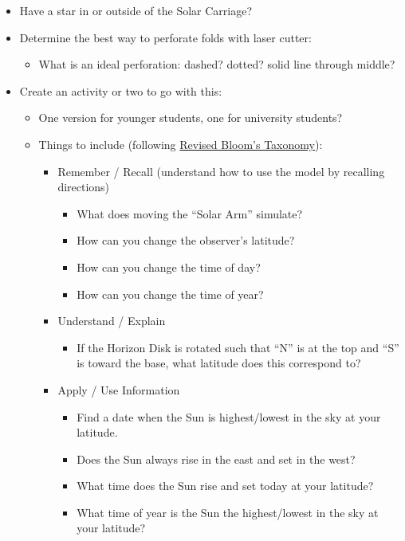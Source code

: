 \documentclass[tikz]{article}
\begin{document}
\begin{itemize}
		\item Have a star in or outside of the Solar Carriage?
		\item Determine the best way to perforate folds with laser cutter: 
		\begin{itemize}
			\item What is an ideal perforation: dashed? dotted? solid line through middle?
		\end{itemize}
		\item Create an activity or two to go with this: 
		\begin{itemize}
			\item One version for younger students, one for university students?
			\item Things to include (following \href{https://cft.vanderbilt.edu/guides-sub-pages/blooms-taxonomy/}{Revised Bloom's Taxonomy}): 
			\begin{itemize}
				\item Remember / Recall (understand how to use the model by recalling directions)
				\begin{itemize}
					\item What does moving the ``Solar Arm'' simulate?
					\item How can you change the observer's latitude? 
					\item How can you change the time of day? 
					\item How can you change the time of year? 
				\end{itemize}
				\item Understand / Explain
				\begin{itemize}
					\item If the Horizon Disk is rotated such that ``N'' is at the top and ``S'' is toward the base, what latitude does this correspond to? 
				\end{itemize}
				\item Apply / Use Information
				\begin{itemize}
					\item Find a date when the Sun is highest/lowest in the sky at your latitude.
					\item Does the Sun always rise in the east and set in the west? 
					\item What time does the Sun rise and set today at your latitude?
					\item What time of year is the Sun the highest/lowest in the sky at your latitude?

\end{itemize}
\end{itemize}
\end{itemize}
\end{itemize}
\end{document}
